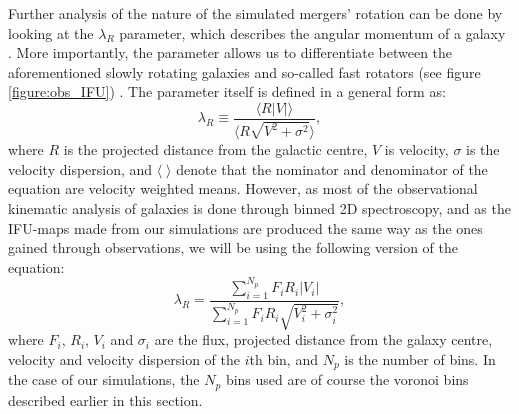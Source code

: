 \documentclass[english, oneside]{HYgradu}
\begin{document}
Further analysis of the nature of the simulated mergers' rotation can be done by looking at the $\lambda_R$ parameter, which describes the angular momentum of a galaxy \citep{Emsellem2007}. More importantly, the parameter allows us to differentiate between the aforementioned slowly rotating galaxies and so-called fast rotators (see figure \ref{figure:obs_IFU}) \citep{Emsellem2007}. The parameter itself is defined in a general form as:
\begin{equation}
\lambda_R \equiv \frac{\langle R |V| \rangle}{\langle R \sqrt{V^2 + \sigma^2} \rangle}, \label{eq:general_lambdar}
\end{equation}
where $R$ is the projected distance from the galactic centre, $V$ is velocity, $\sigma$ is the velocity dispersion, and $\langle \; \rangle$ denote that the nominator and denominator of the equation are velocity weighted means. However, as most of the observational kinematic analysis of galaxies is done through binned 2D spectroscopy, and as the IFU-maps made from our simulations are produced the same way as the ones gained through observations, we will be using the following version of the equation:
\begin{equation}
\lambda_R = \frac{\sum^{N_p}_{i=1} F_i R_i |V_i|}{\sum^{N_p}_{i=1} F_i R_i \sqrt{V_i^2 + \sigma^2_i}}, \label{eq:binned_lambdar}
\end{equation}
where $F_i$, $R_i$, $V_i$ and $\sigma_i$ are the flux, projected distance from the galaxy centre, velocity and velocity dispersion of the $i$th bin, and $N_p$ is the number of bins. In the case of our simulations, the $N_p$ bins used are of course the voronoi bins described earlier in this section. 
\end{document}
